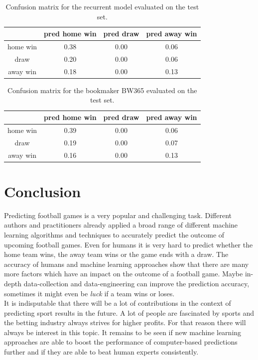 \documentclass[a4paper]{article}
\begin{document}
\begin{table}
\begin{tabular}{|c||c|c|c|}
\hline 
 & pred home win & pred draw  & pred away win \\ 
\hline 
\hline
home win & 0.38 & 0.00 & 0.06 \\ 
\hline 
draw & 0.20 & 0.00 & 0.06 \\ 
\hline 
away win & 0.18 & 0.00 & 0.13 \\ 
\hline 
\end{tabular} 
\caption{Confusion matrix for the recurrent model evaluated on the test set.}
\label{tab:confrnn}
\end{table}


\begin{table}
\begin{tabular}{|c||c|c|c|}
\hline 
 & pred home win & pred draw  & pred away win \\ 
\hline 
\hline
home win & 0.39 & 0.00 & 0.06 \\ 
\hline 
draw & 0.19 & 0.00 & 0.07 \\ 
\hline 
away win & 0.16 & 0.00 & 0.13 \\ 
\hline 
\end{tabular} 
\caption{Confusion matrix for the bookmaker BW365 evaluated on the test set.}
\label{tab:confbm}
\end{table}

\FloatBarrier

\section{Conclusion} \label{conclusion}
Predicting football games is a very popular and challenging task. Different authors and practitioners
already applied a broad range of different machine learning algorithms
and techniques to accurately predict the outcome of upcoming football games.
Even for humans it is very hard to predict whether the home team wins, the away
team wins or the game ends with a draw. The accuracy of humans and machine
learning approaches show that there are many more factors which have an impact
on the outcome of a football game. Maybe in-depth data-collection and
data-engineering can improve the prediction accuracy, sometimes it might even be
\textit{luck} if a team wins or loses.
\\
It is indisputable that there will be a lot of contributions in the context of
predicting sport results in the future. A lot of people are fascinated by
sports and the betting industry always strives for higher profits. For that reason there
will always be interest in this topic. It remains to be seen if new machine
learning approaches are able to boost the performance of
computer-based predictions further and if they are able to beat
human experts consistently.



\end{document}
